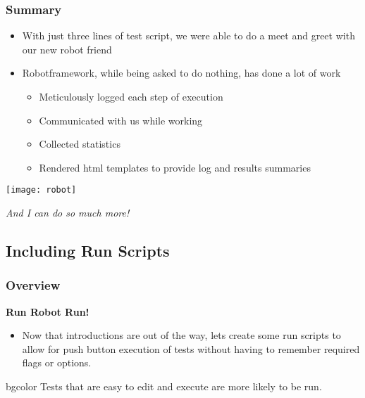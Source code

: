 \documentclass[xcolor=table,handout]{beamer}
\begin{document}
\begin{frame}\frametitle{Summary}
    \begin{itemize}
        \item With just three lines of test script, we were able to do a meet and greet with our new robot friend
        \item Robotframework, while being asked to do nothing, has done a lot of work
            \begin{itemize}\footnotesize
                \item Meticulously logged each step of execution
                \item Communicated with us while working
                \item Collected statistics
                \item Rendered html templates to provide log and results summaries
            \end{itemize}
    \end{itemize}
    \begin{center}
    \texttt{[image: robot]}
        
    \emph{And I can do so much more!}
    \end{center}
\end{frame}


\subsection{Including Run Scripts}
\begin{frame}\frametitle{Overview}
    \vfill
    \begin{center}\LARGE\bf
        Run Robot Run!
    \end{center}
    \vfill
    \begin{itemize}
        \item Now that introductions are out of the way, lets create some run scripts to allow for push button execution of tests without having to remember required flags or options.
    \end{itemize}
    \vfill
     \begin{beamercolorbox}[rounded=true, center, shadow=true,wd=\textwidth]{bgcolor}
    \footnotesize Tests that are easy to edit and execute are more likely to be run.
     \end{beamercolorbox}
\end{frame}
\end{document}
